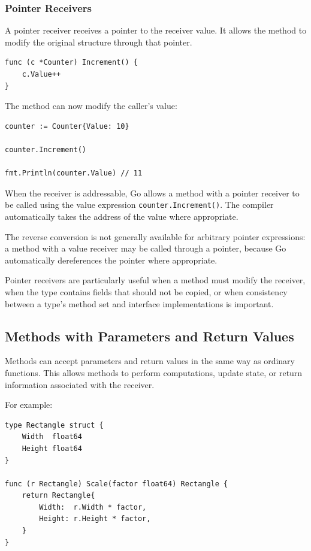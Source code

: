 \subsubsection{Pointer Receivers}

A pointer receiver receives a pointer to the receiver value. It allows the method to modify the original structure through that pointer.

\begin{lstlisting}
func (c *Counter) Increment() {
    c.Value++
}
\end{lstlisting}

The method can now modify the caller's value:

\begin{lstlisting}
counter := Counter{Value: 10}

counter.Increment()

fmt.Println(counter.Value) // 11
\end{lstlisting}

When the receiver is addressable, Go allows a method with a pointer receiver to be called using the value expression \texttt{counter.Increment()}. The compiler automatically takes the address of the value where appropriate.

The reverse conversion is not generally available for arbitrary pointer expressions: a method with a value receiver may be called through a pointer, because Go automatically dereferences the pointer where appropriate.

Pointer receivers are particularly useful when a method must modify the receiver, when the type contains fields that should not be copied, or when consistency between a type's method set and interface implementations is important.

\subsection{Methods with Parameters and Return Values}

Methods can accept parameters and return values in the same way as ordinary functions. This allows methods to perform computations, update state, or return information associated with the receiver.

For example:

\begin{lstlisting}
type Rectangle struct {
    Width  float64
    Height float64
}

func (r Rectangle) Scale(factor float64) Rectangle {
    return Rectangle{
        Width:  r.Width * factor,
        Height: r.Height * factor,
    }
}
\end{lstlisting}

